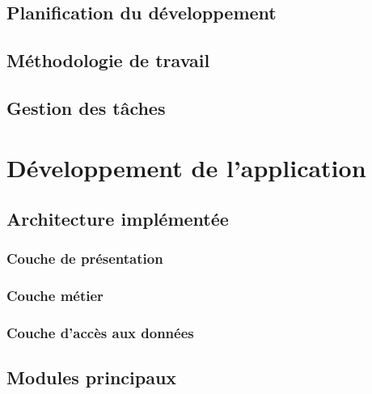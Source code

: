\subsection{Planification du développement}


\subsection{Méthodologie de travail}


\subsection{Gestion des tâches}


\section{Développement de l'application}


\subsection{Architecture implémentée}


\subsubsection{Couche de présentation}


\subsubsection{Couche métier}


\subsubsection{Couche d'accès aux données}


\subsection{Modules principaux}

